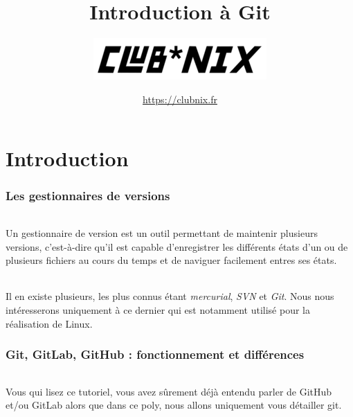 \documentclass[french, a4paper, 12pt, titlepage]{article}
\begin{document}
\title{Introduction à Git}
\author{\includegraphics{clubnix}}
\date{\url{https://clubnix.fr}}

\maketitle

\vfill
\pagebreak

\newpage
\strut\thispagestyle{empty}
\vfill
\pagebreak
\tableofcontents
\strut\thispagestyle{empty}
\newpage
\setcounter{page}{1}

\part{Introduction}

\section{Les gestionnaires de versions}

\paragraph{} Un gestionnaire de version est un outil permettant de maintenir plusieurs versions, c'est-à-dire qu'il est capable d'enregistrer les différents états d'un ou de plusieurs fichiers au cours du temps et de naviguer facilement entres ses états.

\paragraph{}Il en existe plusieurs, les plus connus étant \emph{mercurial}, \emph{SVN} et \emph{Git}.  Nous nous intéresserons uniquement à ce dernier qui est notamment utilisé pour la réalisation de Linux.

\section{Git, GitLab, GitHub : fonctionnement et différences}

\paragraph{}Vous qui lisez ce tutoriel, vous avez sûrement déjà entendu parler de GitHub et/ou GitLab alors que dans ce poly, nous allons uniquement vous détailler git.
\end{document}

